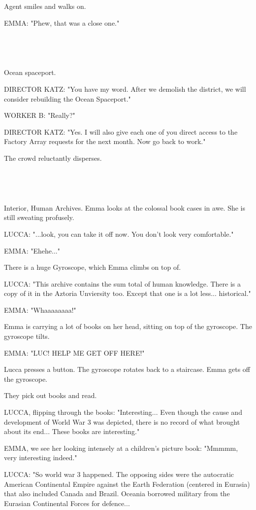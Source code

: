 \documentclass[11pt]{article}
\begin{document}
Agent smiles and walks on.

EMMA: "Phew, that was a close one."

\ 

\ 

Ocean spaceport.

DIRECTOR KATZ: "You have my word.
After we demolish the district, we will consider rebuilding the Ocean Spaceport."

WORKER B: "Really?"

DIRECTOR KATZ: "Yes. 
I will also give each one of you direct access to the Factory Array requests for the next month. 
Now go back to work."

The crowd reluctantly disperses.

\ 

\ 

Interior, Human Archives.
Emma looks at the colossal book cases in awe.
She is still sweating profusely.

LUCCA: "...look, you can take it off now. 
You don't look very comfortable."

EMMA: "Ehehe..."

There is a huge Gyroscope, which Emma climbs on top of.

LUCCA: "This archive contains the sum total of human knowledge. 
There is a copy of it in the Aztoria Unviersity too.
Except that one is a lot less... historical."

EMMA: "Whaaaaaaaa!"

Emma is carrying a lot of books on her head, sitting on top of the gyroscope. The gyroscope tilts.

EMMA: "LUC! HELP ME GET OFF HERE!"

Lucca presses a button. The gyroscope rotates back to a staircase. 
Emma gets off the gyroscope.

They pick out books and read.

LUCCA, flipping through the books: "Interesting...
Even though the cause and development of World War 3 was depicted, there is no record of what brought about its end...
These books are interesting."

EMMA, we see her looking intensely at a children's picture book: "Mmmmm, very interesting indeed."

LUCCA: "So world war 3 happened. 
The opposing sides were the autocratic American Continental Empire against the Earth Federation (centered in Eurasia) that also included Canada and Brazil.
Oceania borrowed military from the Eurasian Continental Forces for defence...
\end{document}
